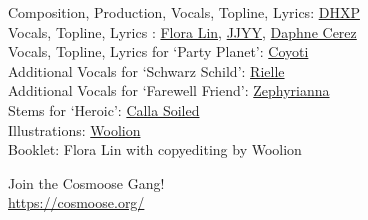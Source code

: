 
Composition, Production, Vocals, Topline, Lyrics: \href{https://linktr.ee/dhxp}{DHXP}\\
Vocals, Topline, Lyrics : \href{https://www.youtube.com/channel/UC7pM7YKe9U1D1Xl4s_xroBw}{Flora Lin}, \href{https://instagram.com/teoritical}{JJYY}, \href{https://daphnecerez.carrd.co/}{Daphne Cerez} \\
Vocals, Topline, Lyrics for `Party Planet': \href{https://www.echothehuman.com/}{Coyoti} \\
Additional Vocals for `Schwarz Schild': \href{https://www.youtube.com/channel/UCQ06IBpvrf0wRukwGWuM90A}{Rielle} \\
Additional Vocals for `Farewell Friend': \href{https://www.youtube.com/c/zephyriannach}{Zephyrianna} \\
Stems for `Heroic': \href{https://soundcloud.com/callasoiled/heroicskeb-8}{Calla Soiled} \\
Illustrations: \href{https://twitter.com/wooliondraws}{Woolion}\\
Booklet: Flora Lin with copyediting by Woolion

\vspace*{\fill}
\begin{center}
    Join the Cosmoose Gang!\\
    \Large{\url{https://cosmoose.org/}}
\end{center}

\clearpage

